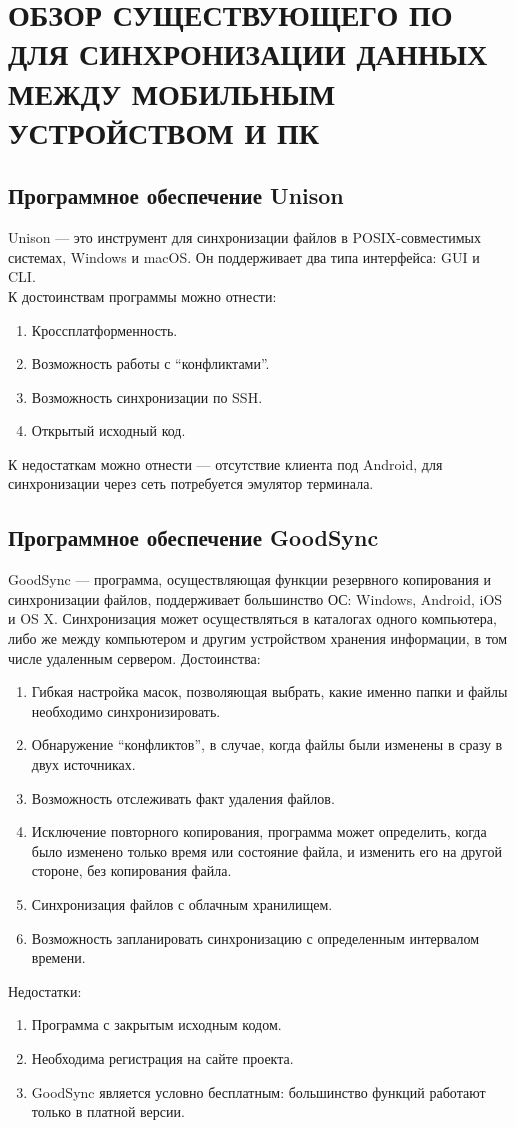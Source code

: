 \section{\nohyphens{ОБЗОР СУЩЕСТВУЮЩЕГО ПО ДЛЯ СИНХРОНИЗАЦИИ ДАННЫХ МЕЖДУ МОБИЛЬНЫМ УСТРОЙСТВОМ И ПК}}

\subsection{Программное обеспечение Unison}
Unison --- это инструмент для синхронизации файлов в  POSIX-совместимых системах, Windows и macOS\cite{unison}. Он поддерживает два типа интерфейса: GUI и CLI.\\
К достоинствам программы можно отнести:
\begin{enumerate}
	\item Кроссплатформенность.
	\item Возможность работы с ``конфликтами''.
	\item Возможность синхронизации по SSH.
	\item Открытый исходный код.
\end{enumerate}
К недостаткам можно отнести — отсутствие клиента под Android, для синхронизации через сеть потребуется эмулятор терминала.

\subsection{Программное обеспечение GoodSync}

GoodSync --- программа, осуществляющая функции резервного копирования и синхронизации файлов, поддерживает большинство ОС: Windows, Android, iOS и OS X\cite{goodsync}. Синхронизация может осуществляться в каталогах одного компьютера, либо же между компьютером и другим устройством хранения информации, в том числе удаленным сервером.
Достоинства:
\begin{enumerate}
	\item Гибкая настройка масок, позволяющая выбрать, какие именно папки и файлы необходимо синхронизировать.
	\item Обнаружение ``конфликтов'', в случае, когда файлы были изменены в сразу в двух источниках.
	\item Возможность отслеживать факт удаления файлов.
	\item Исключение повторного копирования, программа может определить, когда было изменено только время или состояние файла, и изменить его на другой стороне, без копирования файла.
	\item Синхронизация файлов с облачным хранилищем.
	\item Возможность запланировать синхронизацию с определенным интервалом времени.
\end{enumerate}
Недостатки:
\begin{enumerate}
	\item Программа с закрытым исходным кодом.
	\item Необходима регистрация на сайте проекта.
	\item GoodSync является условно бесплатным: большинство функций работают только в платной версии.
\end{enumerate}

